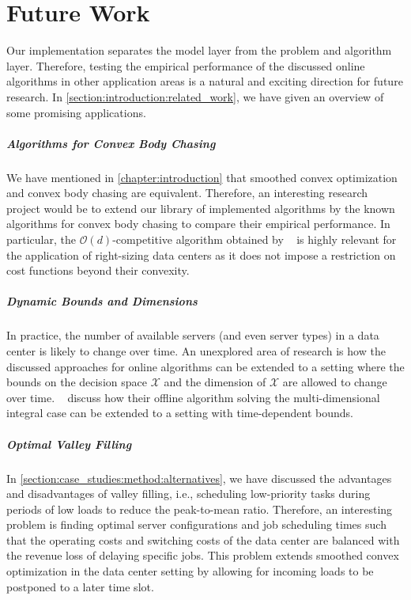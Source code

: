 
\chapter{Future Work}\label{chapter:future_work}

Our implementation separates the model layer from the problem and algorithm layer. Therefore, testing the empirical performance of the discussed online algorithms in other application areas is a natural and exciting direction for future research. In \cref{section:introduction:related_work}, we have given an overview of some promising applications.

\paragraph{Algorithms for Convex Body Chasing} We have mentioned in \autoref{chapter:introduction} that smoothed convex optimization and convex body chasing are equivalent. Therefore, an interesting research project would be to extend our library of implemented algorithms by the known algorithms for convex body chasing to compare their empirical performance. In particular, the $\mathcal{O}(d)$-competitive algorithm obtained by \citeauthor{Argue2019}~\cite{Argue2019} is highly relevant for the application of right-sizing data centers as it does not impose a restriction on cost functions beyond their convexity.

\paragraph{Dynamic Bounds and Dimensions} In practice, the number of available servers (and even server types) in a data center is likely to change over time. An unexplored area of research is how the discussed approaches for online algorithms can be extended to a setting where the bounds on the decision space $\mathcal{X}$ and the dimension of $\mathcal{X}$ are allowed to change over time. \citeauthor{Albers2021_2}~\cite{Albers2021_2} discuss how their offline algorithm solving the multi-dimensional integral case can be extended to a setting with time-dependent bounds.

\paragraph{Optimal Valley Filling} In \cref{section:case_studies:method:alternatives}, we have discussed the advantages and disadvantages of valley filling, i.e., scheduling low-priority tasks during periods of low loads to reduce the peak-to-mean ratio. Therefore, an interesting problem is finding optimal server configurations and job scheduling times such that the operating costs and switching costs of the data center are balanced with the revenue loss of delaying specific jobs. This problem extends smoothed convex optimization in the data center setting by allowing for incoming loads to be postponed to a later time slot.

